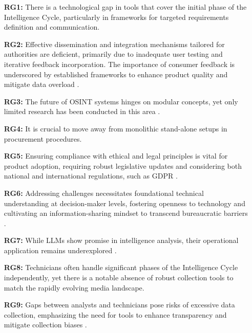 \documentclass[10pt]{article}
\begin{document}
\begin{itemize}
    \item[\textbf{RG1:}] There is a technological gap in tools that cover the initial phase of the Intelligence Cycle, particularly in frameworks for targeted requirements definition and communication.

        \item[\textbf{RG2:}]Effective dissemination and integration mechanisms tailored for authorities are deficient, primarily due to inadequate user testing and iterative feedback incorporation. The importance of consumer feedback is underscored by established frameworks to enhance product quality and mitigate data overload \cite{JointChiefsofStaffU.S.Army.2013, NorthAtlanticTreatyOrganization.2001}.

    \item[\textbf{RG3:}] The future of OSINT systems hinges on modular concepts, yet only limited research has been conducted in this area \cite{Arjun.2020,Wright.2020}.

    \item[\textbf{RG4:}] It is crucial to move away from monolithic stand-alone setups in procurement procedures.

    \item[\textbf{RG5:}] Ensuring compliance with ethical and legal principles is vital for product adoption, requiring robust legislative updates and considering both national and international regulations, such as GDPR \cite{EuropeanParliament.2016,EuropeanCommission.18.08.2023,Wittmer.2022}.

    \item[\textbf{RG6:}] Addressing challenges necessitates foundational technical understanding at decision-maker levels, fostering openness to technology and cultivating an information-sharing mindset to transcend bureaucratic barriers \cite{NorthAtlanticTreatyOrganization.2001}.

    \item[\textbf{RG7:}] While LLMs show promise in intelligence analysis, their operational application remains underexplored \cite{Radford.2023}.

    \item[\textbf{RG8:}] Technicians often handle significant phases of the Intelligence Cycle independently, yet there is a notable absence of robust collection tools to match the rapidly evolving media landscape.

    \item[\textbf{RG9:}] Gaps between analysts and technicians pose risks of excessive data collection, emphasizing the need for tools to enhance transparency and mitigate collection biases \cite{Lowenthal.2020}.
\end{itemize}
\end{document}
